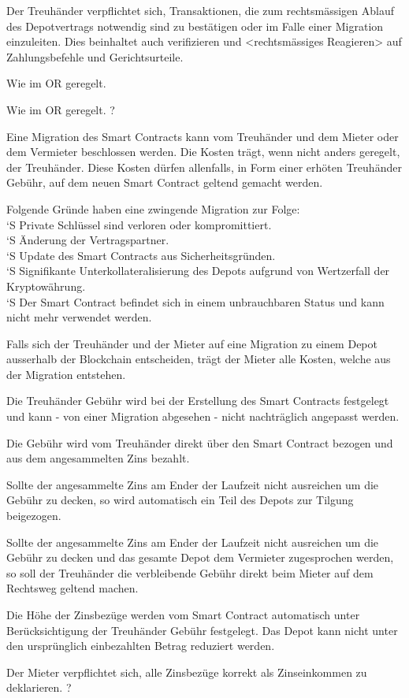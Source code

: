 \documentclass[parskip=half]{scrreprt}
\begin{document}
\begin{contract}
Der Treuhänder verpflichtet sich, Transaktionen, die zum rechtsmässigen Ablauf des Depotvertrags notwendig sind zu bestätigen oder im Falle einer Migration einzuleiten. Dies beinhaltet auch verifizieren und <rechtsmässiges Reagieren> auf Zahlungsbefehle und Gerichtsurteile.



Wie im OR geregelt.


Wie im OR geregelt. ?


Eine Migration des Smart Contracts kann vom Treuhänder und dem Mieter oder dem Vermieter beschlossen werden. Die Kosten trägt, wenn nicht anders geregelt, der Treuhänder. Diese Kosten dürfen allenfalls, in Form einer erhöten Treuhänder Gebühr, auf dem neuen Smart Contract geltend gemacht werden.

Folgende Gründe haben eine zwingende Migration zur Folge:\\
\setcounter{sentence}{0}
`S Private Schlüssel sind verloren oder kompromittiert. \\
`S Änderung der Vertragspartner.\\
`S Update des Smart Contracts aus Sicherheitsgründen.\\
`S Signifikante Unterkollateralisierung des Depots aufgrund von Wertzerfall der Kryptowährung.\\
`S Der Smart Contract befindet sich in einem unbrauchbaren Status und kann nicht mehr verwendet werden.

Falls sich der Treuhänder und der Mieter auf eine Migration zu einem Depot ausserhalb der Blockchain entscheiden, trägt der Mieter alle Kosten, welche aus der Migration entstehen.

Die Treuhänder Gebühr wird bei der Erstellung des Smart Contracts festgelegt und kann - von einer Migration abgesehen - nicht nachträglich angepasst werden.

Die Gebühr wird vom Treuhänder direkt über den Smart Contract bezogen und aus dem angesammelten Zins bezahlt.

Sollte der angesammelte Zins am Ender der Laufzeit nicht ausreichen um die Gebühr zu decken, so wird automatisch ein Teil des Depots zur Tilgung beigezogen.

Sollte der angesammelte Zins am Ender der Laufzeit nicht ausreichen um die Gebühr zu decken und das gesamte Depot dem Vermieter zugesprochen werden, so soll der Treuhänder die verbleibende Gebühr direkt beim Mieter auf dem Rechtsweg geltend machen.


Die Höhe der Zinsbezüge werden vom Smart Contract automatisch unter Berücksichtigung der Treuhänder Gebühr festgelegt. Das Depot kann nicht unter den ursprünglich einbezahlten Betrag reduziert werden.

Der Mieter verpflichtet sich, alle Zinsbezüge korrekt als Zinseinkommen zu deklarieren. ?


\end{contract} 
\end{document}
